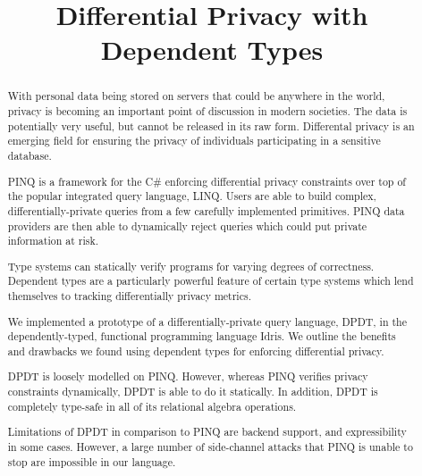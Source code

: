 \documentclass[12pt]{report}
\title{Differential Privacy with Dependent Types}
\begin{document}
\maketitle



\graphicspath{{assets/}}

\begin{abstract}
With personal data being stored on servers that could be anywhere in the world, privacy is becoming an important point of discussion in modern societies.
The data is potentially very useful, but cannot be released in its raw form.
Differental privacy is an emerging field for ensuring the privacy of individuals participating in a sensitive database.

PINQ is a framework for the C\# enforcing differential privacy constraints over top of the popular integrated query language, LINQ.
Users are able to build complex, differentially-private queries from a few carefully implemented primitives.
PINQ data providers are then able to dynamically reject queries which could put private information at risk.

Type systems can statically verify programs for varying degrees of correctness.
Dependent types are a particularly powerful feature of certain type systems which lend themselves to tracking differentially privacy metrics.

We implemented a prototype of a differentially-private query language, DPDT, in the dependently-typed, functional programming language Idris.
We outline the benefits and drawbacks we found using dependent types for enforcing differential privacy.

DPDT is loosely modelled on PINQ.
However, whereas PINQ verifies privacy constraints dynamically, DPDT is able to do it statically.
In addition, DPDT is completely type-safe in all of its relational algebra operations.

Limitations of DPDT in comparison to PINQ are backend support, and expressibility in some cases.
However, a large number of side-channel attacks that PINQ is unable to stop are impossible in our language.
\end{abstract}
\end{document}
